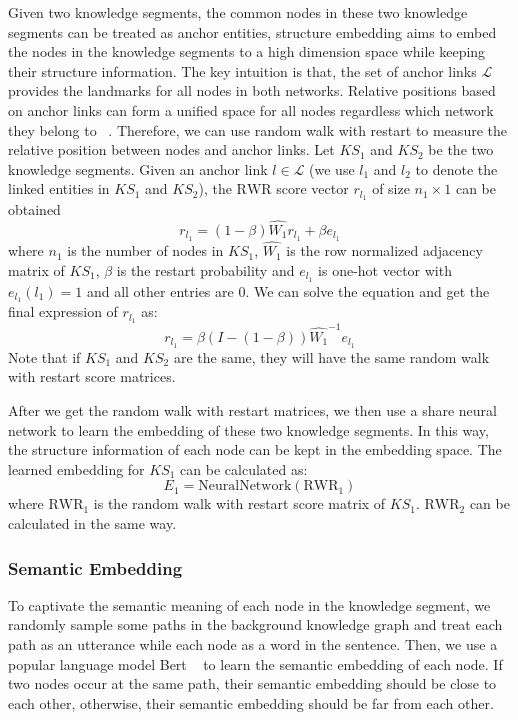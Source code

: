 Given two knowledge segments, the common nodes in these two knowledge segments can be treated as anchor entities, structure embedding
aims to embed the nodes in the knowledge segments to a high dimension space while keeping their structure information.
The key intuition is that, the set of anchor links $\mathcal{L}$ provides the landmarks for all nodes in both networks. Relative positions based on anchor links can form a unified space for all nodes regardless which network they belong to ~\cite{bright}. Therefore, we can use random walk with restart to measure the relative position between nodes and anchor links.
Let $KS_1$ and $KS_2$ be the two knowledge segments.
Given an anchor link $l \in \mathcal{L}$ (we use $l_1$ and $l_2$ to denote the linked entities in $KS_1$ and $KS_2$),
the $\textrm{RWR}$ score vector $r_{l_1}$ of size $n_1 \times 1$ can be obtained
\begin{equation}
r_{l_1} = (1 - \beta)\hat{W_1} r_{l_1} + \beta e_{l_1}
\end{equation}
where $n_1$ is the number of nodes in $KS_1$, $\hat{W_1}$ is the row normalized adjacency matrix of $KS_1$, $\beta$ is the restart probability and $e_{l_1}$ is one-hot vector with  $e_{l_1}(l_1) = 1$ and all other entries are 0.
We can solve the equation and get the final expression of $r_{l_1}$ as:
\begin{equation}
r_{l_1} = \beta (I - (1 - \beta))\hat{W_1}^{-1} e_{l_1}
\end{equation}
Note that if $KS_1$ and $KS_2$ are the same, they will have the same random walk with restart score matrices.

After we get the  random walk with restart matrices, we then use a share neural network to learn the embedding of these two knowledge segments. In this way, the structure information of each node can be kept in the embedding space. The learned embedding for $KS_1$ can be calculated as:
\begin{equation}
E_{1} = \textrm{NeuralNetwork}(\textrm{RWR}_{1})
\end{equation}
where $\textrm{RWR}_{1}$ is the random walk with restart score matrix of $KS_1$. $\textrm{RWR}_{2}$ can be calculated in the same way.

\subsubsection{Semantic Embedding}

To captivate the semantic meaning of each node in the knowledge segment, we randomly sample some paths in the background knowledge graph and treat each path as an utterance while each node as a word in the sentence. Then, we use a popular language model Bert ~\cite{bert} to learn the semantic embedding of each node. If two nodes occur at the same path, their semantic embedding should be close to each other, otherwise, their semantic embedding should be far from each other.


